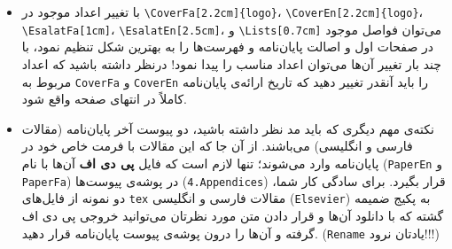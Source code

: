 \begin{itemize}
\item
با تغییر اعداد موجود در 
\verb!\CoverFa[2.2cm]{logo}!،
\verb!\CoverEn[2.2cm]{logo}!،
\linebreak
\verb!\EsalatFa[1cm]!،
\verb!\EsalatEn[2.5cm]!،
و 
\verb!\Lists[0.7cm]!
می‌توان فواصل موجود در صفحات اول و اصالت پایان‌نامه و فهرست‌ها را به بهترین شکل تنظیم نمود، با چند بار تغییر آن‌ها می‌توان اعداد مناسب را پیدا نمود! درنظر داشته باشید که اعداد مربوط به \verb!CoverFa! و \verb!CoverEn! را باید آنقدر تغییر دهید که تاریخ ارائه‌ی پایان‌نامه کاملاً در انتهای صفحه واقع شود.
\item
نکته‌ی مهم دیگری که باید مد نظر داشته باشید، دو پیوست آخر پایان‌نامه (مقالات فارسی و انگلیسی) می‌باشند. از آن جا که این مقالات با فرمت خاص خود در پایان‌نامه وارد می‌شوند؛ تنها لازم است که فایل \textbf{پی دی اف} آن‌ها با نام (\verb!PaperEn! و \verb!PaperFa!) در پوشه‌ی پیوست‌ها (\verb!4.Appendices!) قرار بگیرد. برای سادگی کار شما، دو نمونه از فایل‌های \verb!tex! مقالات فارسی و انگلیسی (\verb!Elsevier!) به پکیج ضمیمه گشته که با دانلود آن‌ها و قرار دادن متن مورد نظرتان می‌توانید خروجی پی دی اف گرفته و آن‌ها را درون پوشه‌ی پیوست پایان‌نامه قرار دهید. (\verb!Rename! یادتان نرود!!!)
\end{itemize}
